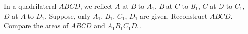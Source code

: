 In a quadrilateral $ABCD$, we reflect $A$ at $B$ to $A_1$, $B$ at $C$ to $B_1$, $C$ at $D$ to $C_1$, $D$ at $A$ to $D_1$. Suppose, only $A_1$, $B_1$, $C_1$, $D_1$ are given. Reconstruct $ABCD$. Compare the areas of $ABCD$ and $A_1B_1C_1D_1$.
